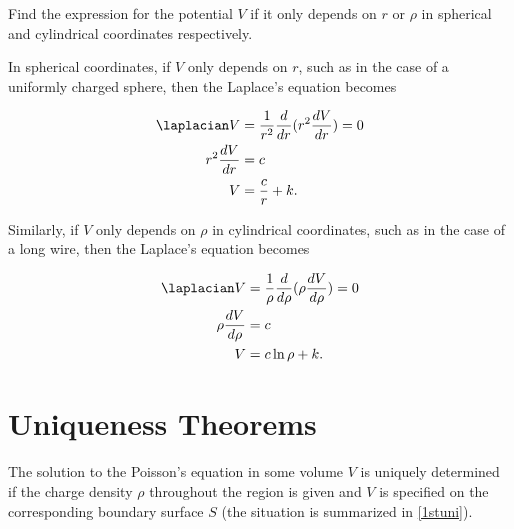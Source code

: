 \documentclass[english,a4paper,12pt]{report}
\begin{document}
{Find the expression for the potential \(V\) if it only depends on  \(r \text { or }  \rho \) in spherical and cylindrical coordinates respectively.}
{In spherical coordinates, if \(V\) only depends on \(r\), such as in the case of a uniformly charged sphere, then the Laplace's equation becomes
    
\begin{equation}
    \begin{aligned}
        \laplacian V &= \frac{1}{r^2}\frac{d}{dr} (r^2 \frac{dV}{dr} ) = 0 \\ 
        r^2 \frac{dV}{dr} &= c \\
        V &= \frac{c}{r} + k . 
    \end{aligned}
\end{equation}

Similarly, if \(V\) only depends on \(\rho \) in cylindrical coordinates, such as in the case of a long wire, then the Laplace's equation becomes 

\begin{equation}
    \begin{aligned}
        \laplacian V &= \frac{1}{\rho } \frac{d}{d \rho} (\rho  \frac{dV}{d \rho}) = 0 \\
        \rho \frac{dV}{d \rho} &= c \\
        V &= c \ln \rho + k.
    \end{aligned}	
\end{equation}} 

\section{Uniqueness Theorems}

\begin{theorem}
The solution to the Poisson's equation in some volume \(V\) is uniquely determined if the charge density \(\rho \) throughout the region is given and \(V\) is specified on the corresponding boundary surface \(S\) (the situation is summarized in \cref{1stuni}). 


\end{theorem}
\end{document}
